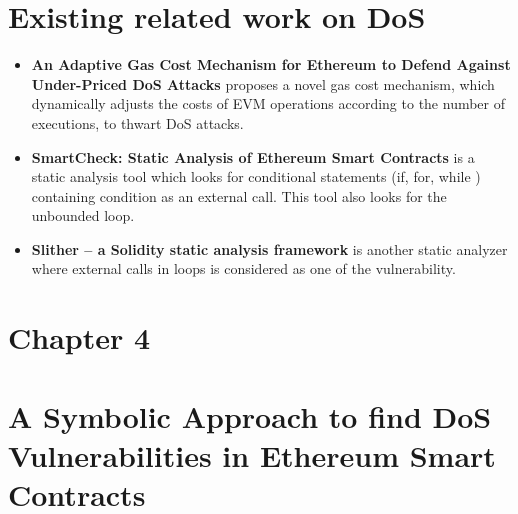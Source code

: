 \documentclass{article}
\begin{document}
\section*{Existing related work on DoS}
\begin{itemize}
    \item \textbf{An Adaptive Gas Cost Mechanism for Ethereum to Defend Against Under-Priced DoS Attacks} proposes a novel gas cost mechanism, which dynamically adjusts the costs of EVM operations according to the number of executions, to thwart DoS attacks. 
    \item \textbf{SmartCheck: Static Analysis of Ethereum Smart Contracts} is a static analysis tool which looks for conditional statements (if, for, while ) containing condition as an external call. This tool also looks for the unbounded loop.
    \item \textbf{Slither – a Solidity static analysis framework} is another static analyzer where external calls in loops is considered as one of the vulnerability. 

\end{itemize}

\newpage
\section*{Chapter 4}
\section*{A Symbolic Approach to find DoS Vulnerabilities in Ethereum Smart Contracts}
\end{document}
